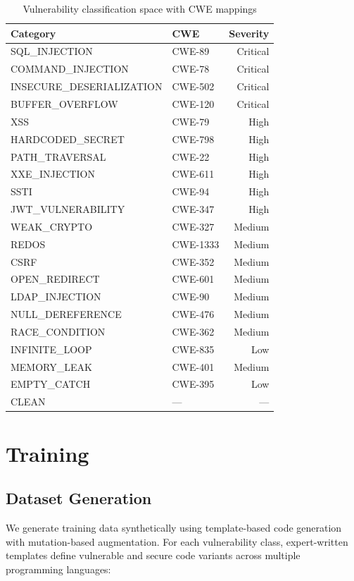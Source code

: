 \documentclass[conference,compsoc]{IEEEtran}
\begin{document}
\begin{table}[h]
\centering
\caption{Vulnerability classification space with CWE mappings}
\label{tab:classes}
\small
\begin{tabular}{llr}
\toprule
\textbf{Category} & \textbf{CWE} & \textbf{Severity} \\
\midrule
SQL\_INJECTION & CWE-89 & Critical \\
COMMAND\_INJECTION & CWE-78 & Critical \\
INSECURE\_DESERIALIZATION & CWE-502 & Critical \\
BUFFER\_OVERFLOW & CWE-120 & Critical \\
XSS & CWE-79 & High \\
HARDCODED\_SECRET & CWE-798 & High \\
PATH\_TRAVERSAL & CWE-22 & High \\
XXE\_INJECTION & CWE-611 & High \\
SSTI & CWE-94 & High \\
JWT\_VULNERABILITY & CWE-347 & High \\
WEAK\_CRYPTO & CWE-327 & Medium \\
REDOS & CWE-1333 & Medium \\
CSRF & CWE-352 & Medium \\
OPEN\_REDIRECT & CWE-601 & Medium \\
LDAP\_INJECTION & CWE-90 & Medium \\
NULL\_DEREFERENCE & CWE-476 & Medium \\
RACE\_CONDITION & CWE-362 & Medium \\
INFINITE\_LOOP & CWE-835 & Low \\
MEMORY\_LEAK & CWE-401 & Medium \\
EMPTY\_CATCH & CWE-395 & Low \\
CLEAN & --- & --- \\
\bottomrule
\end{tabular}
\end{table}

\section{Training}
\label{sec:training}

\subsection{Dataset Generation}

We generate training data synthetically using template-based code generation with mutation-based augmentation. For each vulnerability class, expert-written templates define vulnerable and secure code variants across multiple programming languages:
\end{document}
